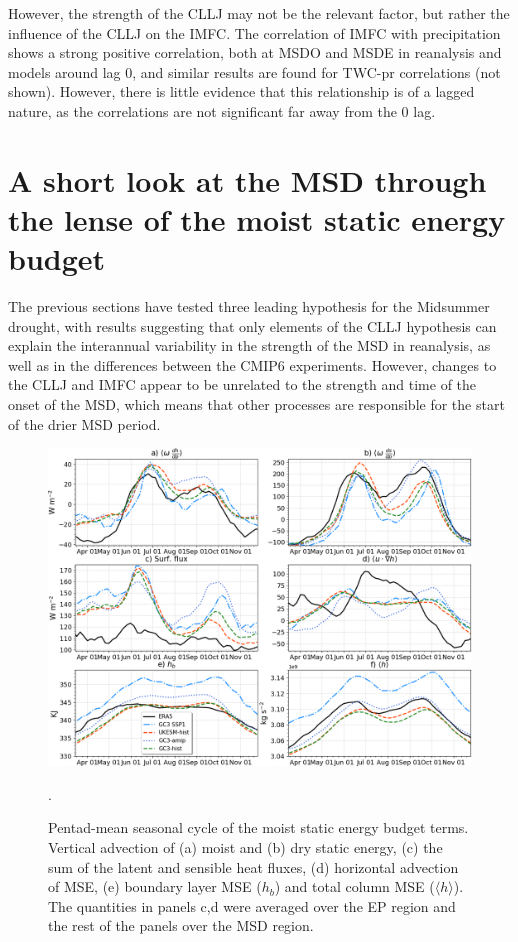 However, the strength of the CLLJ may not be the relevant factor, but rather the influence of the CLLJ on the IMFC. The correlation of IMFC with precipitation shows a strong positive correlation, both at MSDO and MSDE in reanalysis and models around lag 0, and similar results are found for TWC-pr correlations (not shown). However, there is little evidence that this relationship is of a lagged nature, as the correlations are not significant far away from the 0 lag. 



\section{A short look at the MSD through the lense of the moist static energy budget}

The previous sections have tested three leading hypothesis for the Midsummer drought, with results suggesting that only elements of the CLLJ hypothesis can explain the interannual variability in the strength of the MSD in reanalysis, as well as in the differences between the CMIP6 experiments. However, changes to the CLLJ and IMFC appear to be unrelated to the strength and time of the onset of the MSD, which means that other processes are responsible for the start of the drier MSD period. 

\begin{figure}[t!]
\includegraphics[width=\linewidth]{figures/thermopentad}
\caption[Seasonal cycle of MSE budget terms]{Pentad-mean seasonal cycle of the moist static energy budget terms. Vertical advection of (a) moist and (b) dry static energy, (c) the sum of the latent and sensible heat fluxes, (d) horizontal advection of MSE, (e) boundary layer MSE ($h_b$) and total column MSE ($\langle h \rangle$). The quantities in panels c,d were averaged over the EP region and the rest of the panels over the MSD region. }. 
\label{fig:thermo_pentad}
\end{figure}

